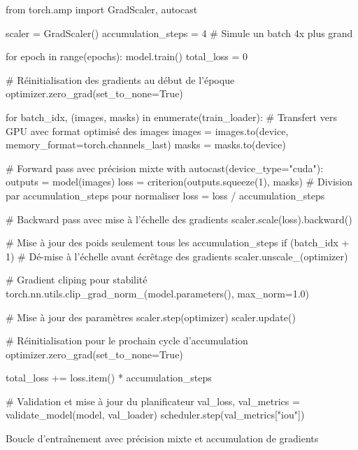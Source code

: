 \begin{code}[H]
    \begin{pythoncode}
    from torch.amp import GradScaler, autocast

    scaler = GradScaler()
    accumulation_steps = 4  # Simule un batch 4x plus grand
    
    for epoch in range(epochs):
        model.train()
        total_loss = 0
        
        # Réinitialisation des gradients au début de l'époque
        optimizer.zero_grad(set_to_none=True)
        
        for batch_idx, (images, masks) in enumerate(train_loader):
            # Transfert vers GPU avec format optimisé des images
            images = images.to(device, memory_format=torch.channels_last)
            masks = masks.to(device)
            
            # Forward pass avec précision mixte
            with autocast(device_type="cuda"):
                outputs = model(images)
                loss = criterion(outputs.squeeze(1), masks)
                # Division par accumulation_steps pour normaliser
                loss = loss / accumulation_steps
            
            # Backward pass avec mise à l'échelle des gradients
            scaler.scale(loss).backward()
            
            # Mise à jour des poids seulement tous les accumulation_steps
            if (batch_idx + 1) %
                # Dé-mise à l'échelle avant écrêtage des gradients
                scaler.unscale_(optimizer)
                
                # Gradient cliping pour stabilité
                torch.nn.utils.clip_grad_norm_(model.parameters(), max_norm=1.0)
                
                # Mise à jour des paramètres
                scaler.step(optimizer)
                scaler.update()
                
                # Réinitialisation pour le prochain cycle d'accumulation
                optimizer.zero_grad(set_to_none=True)
            
            total_loss += loss.item() * accumulation_steps
        
        # Validation et mise à jour du planificateur
        val_loss, val_metrics = validate_model(model, val_loader)
        scheduler.step(val_metrics["iou"])
    \end{pythoncode}
    \caption{Boucle d'entraînement avec précision mixte et accumulation de gradients}
    \label{code:ch36_boucle_entrainement}
\end{code}

